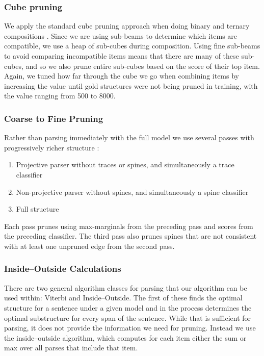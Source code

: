 \subsubsection{Cube pruning}

We apply the standard cube pruning approach when doing binary and ternary compositions \parencite{Chiang:2007}.
Since we are using sub-beams to determine which items are compatible, we use a heap of sub-cubes during composition.
Using fine sub-beams to avoid comparing incompatible items means that there are many of these sub-cubes, and so we also prune entire sub-cubes based on the score of their top item.
Again, we tuned how far through the cube we go when combining items by increasing the value until gold structures were not being pruned in training, with the value ranging from 500 to 8000.

\subsubsection{Coarse to Fine Pruning}

Rather than parsing immediately with the full model we use several passes with progressively richer structure \parencite{Goodman:1997}:

\begin{enumerate}
  \item Projective parser without traces or spines, and simultaneously a trace classifier
  \item Non-projective parser without spines, and simultaneously a spine classifier
  \item Full structure
\end{enumerate}

Each pass prunes using max-marginals from the preceding pass and scores from the preceding classifier.
The third pass also prunes spines that are not consistent with at least one unpruned edge from the second pass.

\subsubsection{Inside--Outside Calculations}

There are two general algorithm classes for parsing that our algorithm can be used within: Viterbi and Inside--Outside.
The first of these finds the optimal structure for a sentence under a given model and in the process determines the optimal substructure for every span of the sentence.
While that is sufficient for parsing, it does not provide the information we need for pruning.
Instead we use the inside--outside algorithm, which computes for each item either the sum or max over all parses that include that item.


